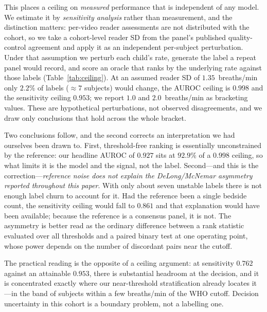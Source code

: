 \documentclass[journal]{IEEEtran}
\begin{document}
This places a ceiling on \emph{measured} performance that is independent of any model. We estimate it by
\emph{sensitivity analysis} rather than measurement, and the distinction matters: per-video reader
assessments are not distributed with the cohort, so we take a cohort-level reader SD from the panel's
published quality-control agreement and apply it as an independent per-subject perturbation. Under that
assumption we perturb each child's rate, generate the label a repeat panel would record, and score an
oracle that ranks by the underlying rate against those labels (Table~\ref{tab:ceiling}). At an assumed
reader SD of $1.35$~breaths/min only $2.2\%$ of labels ($\approx7$ subjects) would change, the AUROC
ceiling is $0.998$ and the sensitivity ceiling $0.953$; we report $1.0$ and $2.0$~breaths/min as
bracketing values. These are hypothetical perturbations, not observed disagreements, and we draw only
conclusions that hold across the whole bracket.

Two conclusions follow, and the second corrects an interpretation we had ourselves been drawn to.
First, threshold-free ranking is essentially unconstrained by the reference: our headline AUROC of
$0.927$ sits at $92.9\%$ of a $0.998$ ceiling, so what limits it is the model and the signal, not the
label. Second---and this is the correction---\emph{reference noise does not explain the DeLong/McNemar
asymmetry reported throughout this paper}. With only about seven unstable labels there is not enough
label churn to account for it. Had the reference been a single bedside count, the sensitivity ceiling
would fall to $0.861$ and that explanation would have been available; because the reference is a
consensus panel, it is not. The asymmetry is better read as the ordinary difference between a rank
statistic evaluated over all thresholds and a paired binary test at one operating point, whose power
depends on the number of discordant pairs near the cutoff.

The practical reading is the opposite of a ceiling argument: at sensitivity $0.762$ against an
attainable $0.953$, there is substantial headroom at the decision, and it is concentrated exactly where
our near-threshold stratification already locates it---in the band of subjects within a few breaths/min
of the WHO cutoff. Decision uncertainty in this cohort is a boundary problem, not a labelling one.
\end{document}
